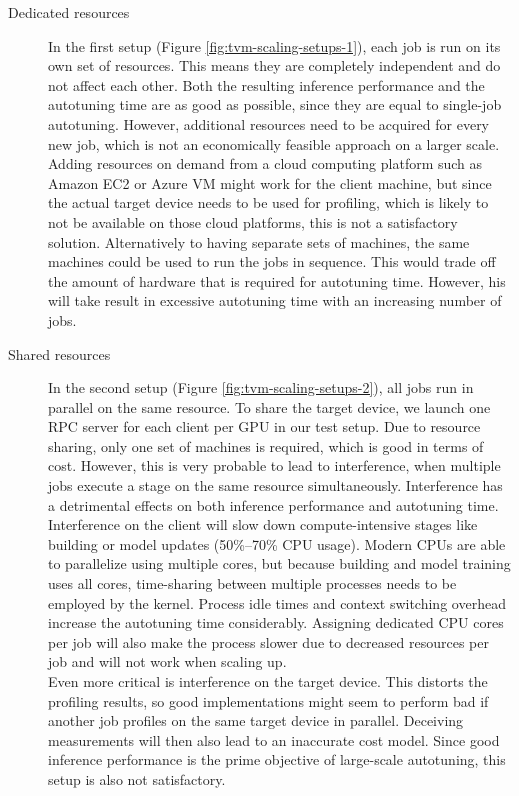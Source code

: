 \begin{description}
	\item[Dedicated resources] In the first setup (Figure \ref{fig:tvm-scaling-setups-1}), each job is run on its own set of resources. This means they are completely independent and do not affect each other. Both the resulting inference performance and the autotuning time are as good as possible, since they are equal to single-job autotuning. However, additional resources need to be acquired for every new job, which is not an economically feasible approach on a larger scale. Adding resources on demand from a cloud computing platform such as Amazon EC2 or Azure VM might work for the client machine, but since the actual target device needs to be used for profiling, which is likely to not be available on those cloud platforms, this is not a satisfactory solution. Alternatively to having separate sets of machines, the same machines could be used to run the jobs in sequence. This would trade off the amount of hardware that is required for autotuning time. However, his will take result in excessive autotuning time with an increasing number of jobs.
	\item[Shared resources] In the second setup (Figure \ref{fig:tvm-scaling-setups-2}), all jobs run in parallel on the same resource. To share the target device, we launch one RPC server for each client per GPU in our test setup. Due to resource sharing, only one set of machines is required, which is good in terms of cost. However, this is very probable to lead to interference, when multiple jobs execute a stage on the same resource simultaneously. Interference has a detrimental effects on both inference performance and autotuning time. Interference on the client will slow down compute-intensive stages like building or model updates (50\%--70\% CPU usage). Modern CPUs are able to parallelize using multiple cores, but because building and model training uses all cores, time-sharing between multiple processes needs to be employed by the kernel. Process idle times and context switching overhead increase the autotuning time considerably. Assigning dedicated CPU cores per job will also make the process slower due to decreased resources per job and will not work when scaling up.\\
	Even more critical is interference on the target device. This distorts the profiling results, so good implementations might seem to perform bad if another job profiles on the same target device in parallel. Deceiving measurements will then also lead to an inaccurate cost model. Since good inference performance is the prime objective of large-scale autotuning, this setup is also not satisfactory.
\end{description}

